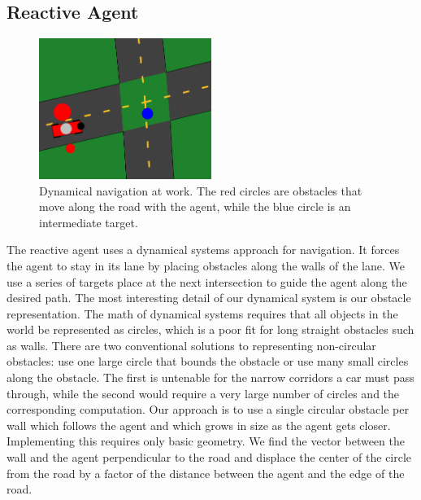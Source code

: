 \documentclass{article}
\begin{document}
\subsection{Reactive Agent}
\begin{figure}[h]
  \begin{center}
    \includegraphics[width=0.5\textwidth]{dynamical}
  \end{center}
  \caption{Dynamical navigation at work. The red circles are obstacles
    that move along the road with the agent, while the blue circle is
    an intermediate target.}
  \label{dynamical}
\end{figure}

The reactive agent uses a dynamical systems approach for
navigation. It forces the agent to stay in its lane by placing
obstacles along the walls of the lane. We use a series of targets
place at the next intersection to guide the agent along the desired
path. The most interesting detail of our dynamical system is our
obstacle representation. The math of dynamical systems requires that
all objects in the world be represented as circles, which is a poor
fit for long straight obstacles such as walls. There are two
conventional solutions to representing non-circular obstacles: use one
large circle that bounds the obstacle or use many small circles along
the obstacle. The first is untenable for the narrow corridors a car
must pass through, while the second would require a very large number
of circles and the corresponding computation. Our approach is to use a
single circular obstacle per wall which follows the agent and which
grows in size as the agent gets closer. Implementing this requires
only basic geometry. We find the vector between the wall and the agent
perpendicular to the road and displace the center of the circle from
the road by a factor of the distance between the agent and the edge of
the road. 
\end{document}
